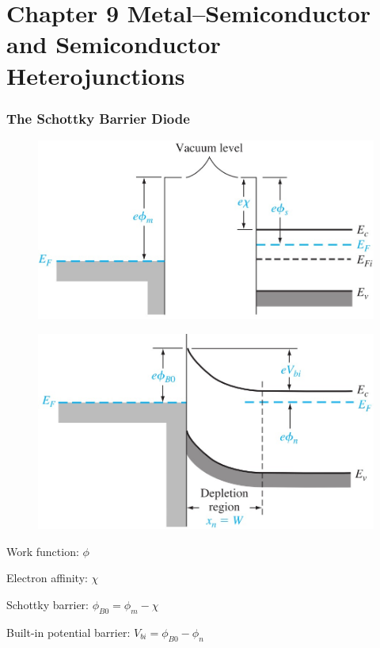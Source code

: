 \documentclass{beamer}
\begin{document}
\section{Chapter 9 Metal–Semiconductor and Semiconductor Heterojunctions}

    \begin{frame} \frametitle{The Schottky Barrier Diode}
        \begin{minipage}{\linewidth}
            \begin{minipage}{0.45\linewidth}
                \begin{figure}[H]
                    \centering
                    \includegraphics[width=\linewidth]{Work-function-graph.jpg}
                    \label{fig:Work-function-graph.jpg}
                \end{figure}
            \end{minipage}
            \begin{minipage}{0.45\linewidth}
                \begin{figure}[H]
                    \centering
                    \includegraphics[width=\linewidth]{Ideal-energy-band-diagram-after-contact.jpg}
                    \label{fig:Ideal-energy-band-diagram-after-contact.jpg}
                \end{figure}
            \end{minipage}
        \end{minipage}
        \par Work function: $\phi$
        \par Electron affinity: $\chi$
        \par Schottky barrier: $\phi_{B0} = \phi_m - \chi$
        \par Built-in potential barrier: $V_{bi} = \phi_{B0} - \phi _n$
    \end{frame}
\end{document}
